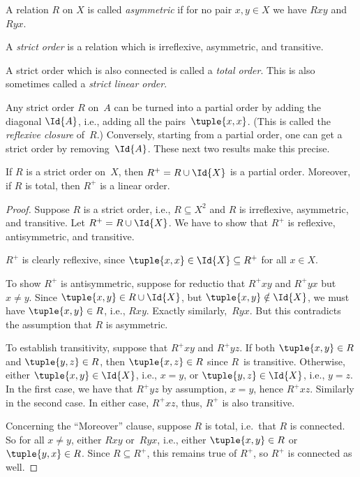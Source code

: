 \documentclass[../../../include/open-logic-section]{subfiles}
\begin{document}
\begin{defn}[Asymmetry]
A relation $R$ on $X$ is called \emph{asymmetric} if for no pair $x,y\in
X$ we have $Rxy$ and $Ryx$. 
\end{defn}

\begin{defn}
A \emph{strict order} is a relation which is irreflexive, asymmetric,
and transitive.
\end{defn}

\begin{defn}
A strict order which is also connected is called a
\emph{total order}. 
This is also sometimes called a \emph{strict linear order}. 
\end{defn}\noindent
Any strict order $R$ on~$A$ can be turned into a partial order
by adding the diagonal $\Id{A}$, i.e., adding all the pairs~$\tuple{x,
  x}$.  (This is called the \emph{reflexive closure} of~$R$.)
Conversely, starting from a partial order, one can get a strict
order by removing~$\Id{A}$. These next two results make this precise.
\begin{prop}
	If $R$ is a strict order on~$X$, then $R^+ = R
    \cup \Id{X}$ is a partial order. Moreover, if $R$ is total, then $R^+$ is a linear order.
\end{prop}
\begin{proof}
    	Suppose $R$ is a strict order, i.e., $R \subseteq
      X^2$ and $R$ is irreflexive, asymmetric, and transitive. Let $R^+
      = R \cup \Id{X}$. We have to show that $R^+$ is reflexive,
      antisymmetric, and transitive.

      $R^+$ is clearly reflexive, since $\tuple{x,
        x} \in \Id{X} \subseteq R^+$ for all $x \in X$. 

      To show $R^+$ is antisymmetric, suppose for reductio that $R^+xy$ and $R^+yx$ but $x \neq y$. Since $\tuple{x,y} \in R \cup \Id{X}$, but $\tuple{x, y} \notin
      \Id{X}$, we must have $\tuple{x, y} \in R$, i.e.,
      $Rxy$. Exactly similarly,~$Ryx$. But this contradicts the
      assumption that $R$ is asymmetric.

      To establish transitivity, suppose that $R^+xy$ and $R^+yz$. If both $\tuple{x, y} \in
      R$ and $\tuple{y,z} \in R$, then $\tuple{x, z} \in R$
      since $R$~is transitive. Otherwise, either $\tuple{x, y} \in
      \Id{X}$, i.e., $x = y$, or $\tuple{y, z} \in \Id{X}$, i.e., $y =
      z$. In the first case, we have that $R^+yz$ by assumption, $x =
      y$, hence $R^+xz$. Similarly in the second case. In either case,
      $R^+xz$, thus, $R^+$ is also transitive.

      Concerning the ``Moreover'' clause, suppose $R$ is total, i.e.\ that $R$ is connected. So for all $x \neq y$, either $Rxy$ or~$Ryx$, i.e., either $\tuple{x, y} \in R$ or $\tuple{y, x} \in
      R$. Since $R \subseteq R^+$, this remains true of $R^+$, so $R^+$ is connected as well.
  \end{proof}
\end{document}
